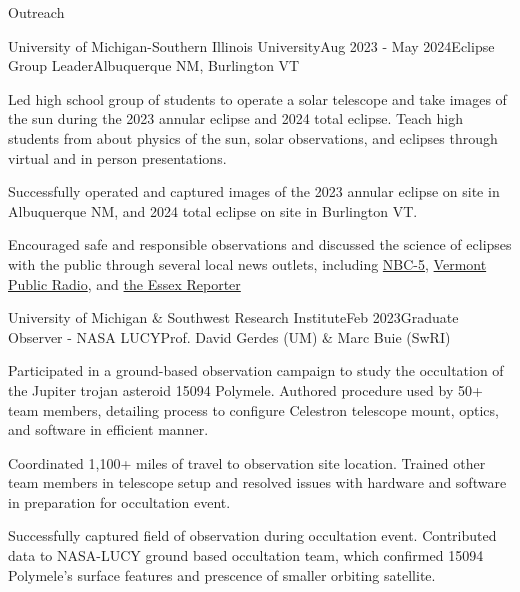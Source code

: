 \documentclass{resume} %
\begin{document}
\begin{rSection}{Outreach}

\begin{rSubsection}{University of Michigan-Southern Illinois University}{Aug 2023 - May 2024}{Eclipse Group Leader}{Albuquerque NM, Burlington VT}
    \item Led high school group of students to operate a solar telescope and take images of the sun during the 2023 annular eclipse and 2024 total eclipse. Teach high students from about physics of the sun, solar observations, and eclipses through virtual and in person presentations.
    \item Successfully operated and captured images of the 2023 annular eclipse on site in Albuquerque NM, and 2024 total eclipse on site in Burlington VT.
    \item Encouraged safe and responsible observations and discussed the science of eclipses with the public through several local news outlets, including \href{https://www.mynbc5.com/article/total-eclipse-nasa/60433342?utm_campaign=snd-autopilot}{NBC-5}, \href{https://www.vermontpublic.org/local-news/2024-04-10/nasa-volunteer-photo-eclipse-burlington-sun-atmosphere}{Vermont Public Radio}, and \href{https://www.essexreporter.com/news/physics-masters-student-collects-data-for-nasa-and-national-science-foundation-from-eclipse-in-burlington/article_1b7a72a8-76d5-52b7-8ffa-886491f640a4.html}{the Essex Reporter}
\end{rSubsection}


\begin{rSubsection}{University of Michigan \& Southwest Research Institute}{Feb 2023}{Graduate Observer - NASA LUCY}{Prof. David Gerdes (UM) \& Marc Buie (SwRI)}
    \item Participated in a ground-based observation campaign to study the occultation of the Jupiter trojan asteroid 15094 Polymele. Authored procedure used by 50+ team members, detailing process to configure Celestron telescope mount, optics, and software in efficient manner.
    \item Coordinated 1,100+ miles of travel to observation site location. Trained other team members in telescope setup and resolved issues with hardware and software in preparation for occultation event.
    \item Successfully captured field of observation during occultation event. Contributed data to NASA-LUCY ground based occultation team, which confirmed 15094 Polymele's surface features and prescence of smaller orbiting satellite.
\end{rSubsection}



\end{rSection}
\end{document}

